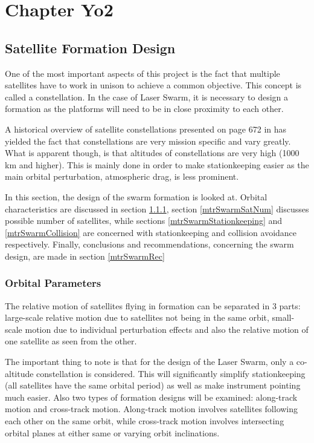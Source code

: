 \documentclass[11pt]{report}
\begin{document}
\chapter{Chapter Yo2}
\section{Satellite Formation Design}
\label{mtrSwarmDesign}
One of the most important aspects of this project is the fact that multiple satellites have to work in unison to achieve a common objective. This concept is called a constellation. In the case of Laser Swarm, it is necessary to design a formation as the platforms will need to be in close proximity to each other. 

A historical overview of satellite constellations presented on page 672 in \cite{constDesign} has yielded the fact that constellations are very mission specific and vary greatly. What is apparent though, is that altitudes of constellations are very high (1000 km and higher). This is mainly done in order to make stationkeeping easier as the main orbital perturbation, atmospheric drag, is less prominent.

In this section, the design of the swarm formation is looked at. Orbital characteristics are discussed in section \ref{mtrSwarmOrbitalParams}, section \ref{mtrSwarmSatNum} discusses possible number of satellites, while sections \ref{mtrSwarmStationkeeping} and \ref{mtrSwarmCollision} are concerned with stationkeeping and collision avoidance respectively. Finally, conclusions and recommendations, concerning the swarm design, are made in section \ref{mtrSwarmRec} 
\subsection{Orbital Parameters}
\label{mtrSwarmOrbitalParams}

The relative motion of satellites flying in formation can be separated in 3 parts: large-scale relative motion due to satellites not being in the same orbit, small-scale motion due to individual perturbation effects and also the relative motion of one satellite as seen from the other.

The important thing to note is that for the design of the Laser Swarm, only a co-altitude constellation is considered. This will significantly simplify stationkeeping (all satellites have the same orbital period) as well as make instrument pointing much easier. Also two types of formation designs will be examined: along-track motion and cross-track motion. Along-track motion involves satellites following each other on the same orbit, while cross-track motion involves intersecting orbital planes at either same or varying orbit inclinations. 
\end{document}
